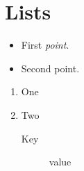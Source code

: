 \documentclass{article}
\begin{document}
\section{Lists}
\begin{itemize}
\item First \emph{point}.
\item Second point.
\end{itemize}
\begin{enumerate}[label=(\alph*)]
\item One
\item Two
\begin{description}
\item[Key] value
\end{description}
\end{enumerate}
\end{document}
